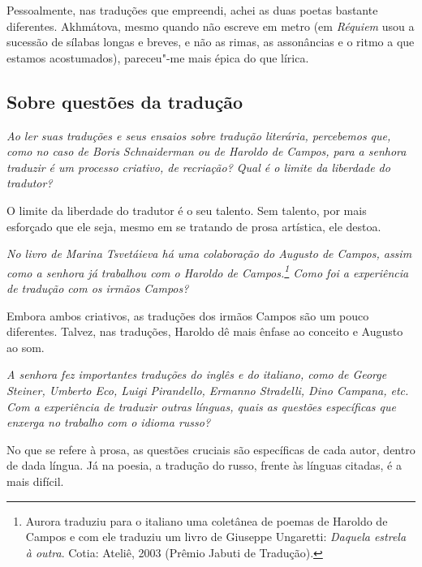 Pessoalmente, nas traduções que empreendi, achei as duas poetas bastante
diferentes. Akhmátova, mesmo quando não escreve em metro
(em \emph{Réquiem} usou a sucessão de sílabas longas e breves, e não as
rimas, as assonâncias e o ritmo a que estamos acostumados), pareceu"-me
mais épica do que lírica.

\subsection{\uppercase{S}obre questões da tradução}

\emph{Ao ler suas traduções e seus ensaios sobre tradução literária,
percebemos que, como no caso de Boris Schnaiderman ou de Haroldo de
Campos, para a senhora traduzir é um processo criativo, de recriação?
Qual é o limite da liberdade do tradutor?}

O limite da liberdade do tradutor é o seu talento. Sem talento, por mais esforçado que ele seja,
mesmo em se tratando de prosa artística, ele destoa.

\medskip

\emph{No livro de Marina Tsvetáieva há uma colaboração do Augusto de
Campos, assim como a senhora já trabalhou com o Haroldo de
Campos.\footnote{Aurora traduziu para o italiano uma coletânea de
  poemas de Haroldo de Campos e com ele traduziu um livro de Giuseppe
  Ungaretti: \emph{Daquela estrela à outra}. Cotia: Ateliê, 2003
  (Prêmio Jabuti de Tradução).} Como foi a experiência de tradução
com os irmãos Campos?}

Embora ambos criativos, as traduções dos irmãos Campos são um pouco
diferentes. Talvez, nas traduções, Haroldo dê mais ênfase ao conceito e
Augusto ao som.

\medskip

\emph{A senhora fez importantes traduções do inglês e do italiano, como
de George Steiner, Umberto Eco, Luigi Pirandello, Ermanno Stradelli,
Dino Campana, etc. Com a experiência de traduzir outras línguas, quais
as questões específicas que enxerga no trabalho com o idioma russo?}

No que se refere à prosa, as questões cruciais são específicas de cada
autor, dentro de dada língua. Já na poesia, a tradução do russo, frente
às línguas citadas, é a mais difícil.

